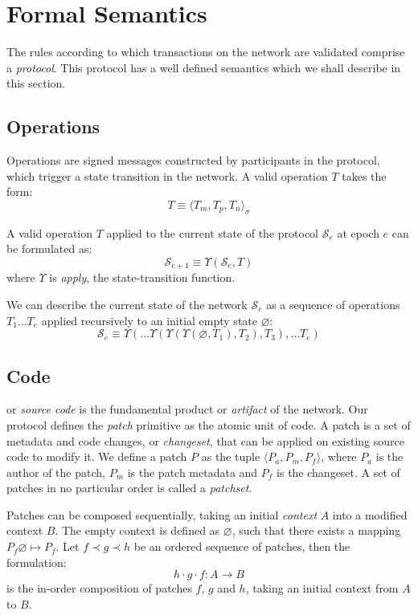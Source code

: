 \section{Formal Semantics}

The rules according to which transactions on the \oscoin{} network are
validated comprise a \emph{protocol}. This protocol has a well defined semantics
which we shall describe in this section.

\subsection{Operations}

Operations are signed messages constructed by participants in the protocol,
which trigger a state transition in the network. A valid operation $T$ takes
the form:
\[
    T \equiv \langle T_m, T_p, T_n \rangle_{\sigma}
\]

A valid operation $T$ applied to the current state of
the protocol $\mathcal{S}_e$ at epoch $e$ can be formulated as:
\[
    \mathcal{S}_{e+1} \equiv \Upsilon(\mathcal{S}_e, T)
\]
where $\Upsilon$ is \emph{apply}, the state-transition function.

We can describe the current state of the network $\mathcal{S}_e$ as a sequence
of operations ${T_1 \dots T_e}$ applied recursively to an initial empty state
$\varnothing$:
\[
    \mathcal{S}_e \equiv \Upsilon(\dots \Upsilon(\Upsilon(\Upsilon(\varnothing,
    T_1), T_2), T_3), \dots T_e)
\]

\subsection{Code} or \emph{source code} is the fundamental product or
\emph{artifact} of the \oscoin{} network. Our protocol defines the \emph{patch}
primitive as the atomic unit of code. A patch is a set of metadata and code
changes, or \emph{changeset}, that can be applied on existing source
code to modify it. We define a patch $P$ as the tuple $\langle P_a, P_m, P_f
\rangle$, where $P_a$ is the author of the patch, $P_m$ is the patch metadata
and $P_f$ is the changeset. A set of patches in no particular order is called a
\emph{patchset}.

Patches can be composed sequentially, taking an initial \emph{context} $A$ into
a modified context $B$. The empty context is defined as $\varnothing$, such
that there exists a mapping $P_f \varnothing \mapsto P_f$.  Let $f \prec g
\prec h$ be an ordered sequence of patches, then the formulation:
\[
h \cdot g \cdot f : A \to B
\]
is the in-order composition of patches $f$, $g$ and $h$, taking an initial
context from $A$ to $B$.

